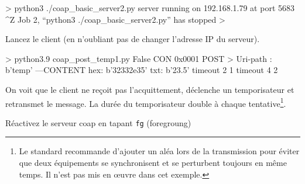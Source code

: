 \begin{termc}[backgroundcolor=\color{palerod}, basicstyle=\ttfamily\small, escapechar=@] 
> python3 ./coap_basic_server2.py 
server running on  192.168.1.79 at port 5683 ^Z
Job 2, “python3 ./coap_basic_server2.py” has stopped
>
\end{termc}

Lancez le client  (en n'oubliant pas de changer l'adresse IP du serveur).

\begin{termc}[backgroundcolor=\color{gray!10}, basicstyle=\ttfamily\small, escapechar=@] 
> python3.9 coap_post_temp1.py 
False
CON  0x0001 POST  
> Uri-path : b'temp'
---CONTENT
hex: b'32332e35'
txt: b'23.5'
timeout 2 1
timeout 4 2
\end{termc}

On voit que le client ne reçoit pas l'acquittement, déclenche un temporisateur et retransmet le message. La durée du temporisateur double à chaque tentative\footnote{Le standard recommande d'ajouter un aléa lors de la transmission pour éviter que deux équipements se synchronisent et se perturbent toujours en même temps. Il n'est pas mis en œuvre dans cet exemple.}.

Réactivez le serveur coap en tapant \texttt{fg} (foregroung)

